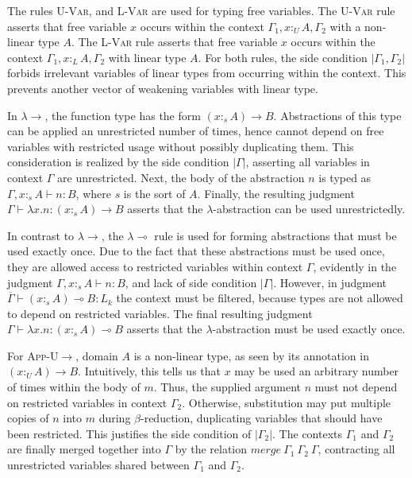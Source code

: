 \documentclass[sigplan,screen,review,anonymous]{acmart}
\newcommand{\rname}[1]{\textsc{\footnotesize #1}}
\newcommand{\pure}[1]{|#1|}
\newcommand{\utype}{:_{\scriptscriptstyle U}}
\newcommand{\ltype}{:_{\scriptscriptstyle L}}
\newcommand{\stype}[1]{:_#1}
\newcommand{\mrg}[3]{merge\ {#1}\ {#2}\ {#3}}
\begin{document}
The rules \rname{U-Var}, and \rname{L-Var} are used for typing free variables. The \rname{U-Var} rule asserts that free variable $x$ occurs within the context $\Gamma_1, x \utype A, \Gamma_2$ with a non-linear type $A$. The \rname{L-Var} rule asserts that free variable $x$ occurs within the context $\Gamma_1, x \ltype A, \Gamma_2$ with linear type $A$. For both rules, the side condition $\pure{\Gamma_1, \Gamma_2}$ forbids irrelevant variables of linear types from occurring within the context. This prevents another vector of weakening variables with linear type.

In \rname{$\lambda$$\rightarrow$}, the function type has the form $(x \stype{s} A) \rightarrow B$. Abstractions of this type can be applied an unrestricted number of times, hence cannot depend on free variables with restricted usage without possibly duplicating them. This consideration is realized by the side condition $\pure{\Gamma}$, asserting all variables in context $\Gamma$ are unrestricted. Next, the body of the abstraction $n$ is typed as $\Gamma, x \stype{s} A \vdash n : B$, where $s$ is the sort of $A$. Finally, the resulting judgment $\Gamma \vdash \lambda x.n : (x \stype{s} A) \rightarrow B$ asserts that the $\lambda$-abstraction can be used unrestrictedly.

In contrast to \rname{$\lambda$$\rightarrow$}, the \rname{$\lambda$$\multimap$} rule is used for forming abstractions that must be used exactly once. Due to the fact that these abstractions must be used once, they are allowed access to restricted variables within context $\Gamma$, evidently in the judgment $\Gamma, x \stype{s} A \vdash n : B$, and lack of side condition $\pure{\Gamma}$. However, in judgment $\overline{\Gamma} \vdash (x \stype{s} A) \multimap B : L_k$ the context must be filtered, because types are not allowed to depend on restricted variables. The final resulting judgment $\Gamma \vdash \lambda x.n : (x \stype{s} A) \multimap B$ asserts that the $\lambda$-abstraction must be used exactly once.

For \rname{App-U$\rightarrow$}, domain $A$ is a non-linear type, as seen by its annotation in $(x \utype A) \rightarrow B$. Intuitively, this tells us that $x$ may be used an arbitrary number of times within the body of $m$. Thus, the supplied argument $n$ must not depend on restricted variables in context $\Gamma_2$. Otherwise, substitution may put multiple copies of $n$ into $m$ during $\beta$-reduction, duplicating variables that should have been restricted. This justifies the side condition of $\pure{\Gamma_2}$. The contexts $\Gamma_1$ and $\Gamma_2$ are finally merged together into $\Gamma$ by the relation $\mrg{\Gamma_1}{\Gamma_2}{\Gamma}$, contracting all unrestricted variables shared between $\Gamma_1$ and $\Gamma_2$.
\end{document}
